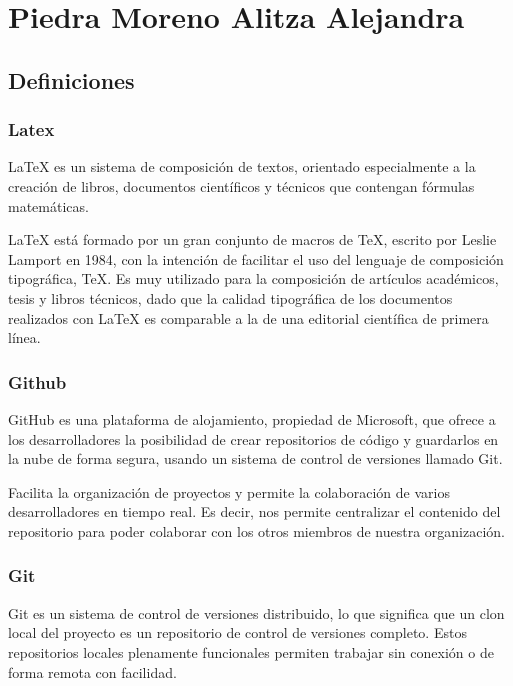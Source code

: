 \section{Piedra Moreno Alitza Alejandra}
\subsection{Definiciones}

\subsubsection{Latex}
LaTeX es un sistema de composición de textos, orientado especialmente a la creación de libros, documentos científicos y técnicos que contengan fórmulas matemáticas.

LaTeX está formado por un gran conjunto de macros de TeX, escrito por Leslie Lamport en 1984, con la intención de facilitar el uso del lenguaje de composición tipográfica, TeX. Es muy utilizado para la composición de artículos académicos, tesis y libros técnicos, dado que la calidad tipográfica de los documentos realizados con LaTeX es comparable a la de una editorial científica de primera línea.
\cite{Dlsi.ua.es}

\subsubsection{Github}

GitHub es una plataforma de alojamiento, propiedad de Microsoft, que ofrece a los desarrolladores la posibilidad de crear repositorios de código y guardarlos en la nube de forma segura, usando un sistema de control de versiones llamado Git.

Facilita la organización de proyectos y permite la colaboración de varios desarrolladores en tiempo real. Es decir, nos permite centralizar el contenido del repositorio para poder colaborar con los otros miembros de nuestra organización.
\cite{Platzi}

\subsubsection{Git}

Git es un sistema de control de versiones distribuido, lo que significa que un clon local del proyecto es un repositorio de control de versiones completo. Estos repositorios locales plenamente funcionales permiten trabajar sin conexión o de forma remota con facilidad.

